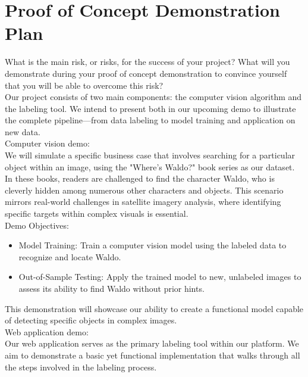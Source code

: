 \documentclass{article}
\begin{document}

\section{Proof of Concept Demonstration Plan}

What is the main risk, or risks, for the success of your project?  What will you
demonstrate during your proof of concept demonstration to convince yourself that
you will be able to overcome this risk?\\

Our project consists of two main components: the computer vision algorithm and the labeling tool. We intend to present both in our upcoming demo to illustrate the complete pipeline—from data labeling to model training and application on new data.\\

Computer vision demo:\\

We will simulate a specific business case that involves searching for a particular object within an image, using the "Where's Waldo?" book series as our dataset. In these books, readers are challenged to find the character Waldo, who is cleverly hidden among numerous other characters and objects. This scenario mirrors real-world challenges in satellite imagery analysis, where identifying specific targets within complex visuals is essential.\\

Demo Objectives:

\begin{itemize}
    \item Model Training: Train a computer vision model using the labeled data to recognize and locate Waldo.
    \item Out-of-Sample Testing: Apply the trained model to new, unlabeled images to assess its ability to find Waldo without prior hints.
\end{itemize}

This demonstration will showcase our ability to create a functional model capable of detecting specific objects in complex images.\\

Web application demo:\\

Our web application serves as the primary labeling tool within our platform. We aim to demonstrate a basic yet functional implementation that walks through all the steps involved in the labeling process.\\
\end{document}
